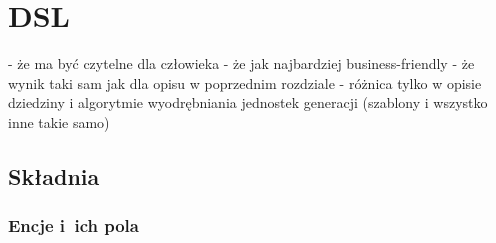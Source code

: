 \chapter{DSL}

- że ma być czytelne dla człowieka
- że jak najbardziej business-friendly
- że wynik taki sam jak dla opisu w poprzednim rozdziale
- różnica tylko w opisie dziedziny i algorytmie wyodrębniania jednostek generacji (szablony i wszystko inne takie samo)

\section{Składnia}

\subsection{Encje i~ich pola}

